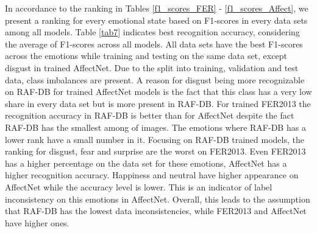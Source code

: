 \documentclass[a4paper, conference]{IEEEtran}
\begin{document}
In accordance to the ranking in Tables \ref{f1_scores_FER} -  \ref{f1_scores_Affect}, we present a ranking for every emotional state based on F1-scores in every data sets among all models. Table \ref{tab7} indicates best recognition accuracy, considering the average of F1-scores across all models. All data sets have the best F1-scores across the emotions while training and testing on the same data set, except disgust in trained AffectNet. Due to the split into training, validation and test data, class imbalances are present. A reason for disgust being more recognizable on RAF-DB for trained AffectNet models is the fact that this class has a very low share in every data set but is more present in RAF-DB. For trained FER2013 the recognition accuracy in RAF-DB is better than for AffectNet despite the fact RAF-DB has the smallest among of images. The emotions where RAF-DB has a lower rank have a small number in it. Focusing on RAF-DB trained models, the ranking for disgust, fear and surprise are the worst on FER2013. Even FER2013 has a higher percentage on the data set for these emotions, AffectNet has a higher recognition accuracy. Happiness and neutral have higher appearance on AffectNet while the accuracy level is lower. This is an indicator of label inconsistency on this emotions in AffectNet. Overall, this leads to the assumption that RAF-DB has the lowest data inconsistencies, while FER2013 and AffectNet have higher ones.
\end{document}

